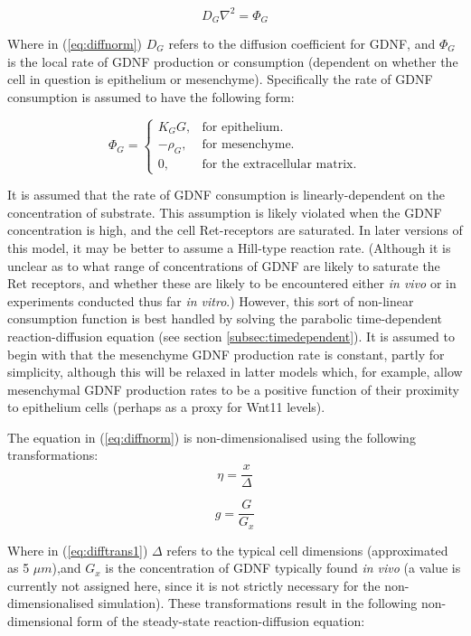\documentclass[pdftex,10pt,a4paper]{article}
\begin{document}
\begin{equation}\label{eq:diffnorm}
D_G \nabla^2 = \Phi_G
\end{equation}

Where in (\ref{eq:diffnorm}) $D_G$ refers to the diffusion coefficient for GDNF, and $\Phi_G$ is the local rate of GDNF production or consumption (dependent on whether the cell in question is epithelium or mesenchyme). Specifically the rate of GDNF consumption is assumed to have the following form:

\begin{equation} \label{eq:production}
\Phi_G =\begin{cases}
K_G G, & \text{for epithelium}.\\
-\rho_G, & \text{for mesenchyme}.\\
0, & \text{for the extracellular matrix}.
\end{cases}
\end{equation}

It is assumed that the rate of GDNF consumption is linearly-dependent on the concentration of substrate. This assumption is likely violated when the GDNF concentration is high, and the cell Ret-receptors are saturated. In later versions of this model, it may be better to assume a Hill-type reaction rate. (Although it is unclear as to what range of concentrations of GDNF are likely to saturate the Ret receptors, and whether these are likely to be encountered either \textit{in vivo} or in experiments conducted thus far \textit{in vitro}.) However, this sort of non-linear consumption function is best handled by solving the parabolic time-dependent reaction-diffusion equation (see section \ref{subsec:timedependent}). It is assumed to begin with that the mesenchyme GDNF production rate is constant, partly for simplicity, although this will be relaxed in latter models which, for example, allow mesenchymal GDNF production rates to be a positive function of their proximity to epithelium cells (perhaps as a proxy for Wnt11 levels).

The equation in (\ref{eq:diffnorm}) is non-dimensionalised using the following transformations:
\begin{equation}\label{eq:difftrans1}
\eta = \frac{x}{\Delta}
\end{equation}

\begin{equation}\label{eq:difftrans2}
g = \frac{G}{G_x}
\end{equation}

Where in (\ref{eq:difftrans1}) $\Delta$ refers to the typical cell dimensions (approximated as 5 $\mu m$),and $G_x$ is the concentration of GDNF typically found \textit{in vivo} (a value is currently not assigned here, since it is not strictly necessary for the non-dimensionalised simulation). These transformations result in the following non-dimensional form of the steady-state reaction-diffusion equation:
\end{document}
